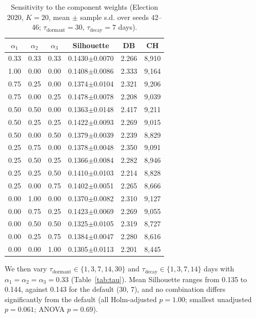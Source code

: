 \documentclass[pdflatex,sn-mathphys-num]{sn-jnl}%
\begin{document}
\begin{table}[t]
\centering
\caption{Sensitivity to the component weights (Election 2020, $K=20$, mean $\pm$ sample s.d. over seeds 42--46; $\tau_{\text{dormant}}=30$, $\tau_{\text{decay}}=7$ days).}
\label{tab:alpha}
\begin{tabular}{cccccc}
\toprule
$\alpha_1$ & $\alpha_2$ & $\alpha_3$ & Silhouette & DB & CH \\
\midrule
0.33 & 0.33 & 0.33 & 0.1430$\pm$0.0070 & 2.266 & 8,910 \\
1.00 & 0.00 & 0.00 & 0.1408$\pm$0.0086 & 2.333 & 9,164 \\
0.75 & 0.25 & 0.00 & 0.1374$\pm$0.0104 & 2.321 & 9,206 \\
0.75 & 0.00 & 0.25 & 0.1478$\pm$0.0078 & 2.208 & 9,039 \\
0.50 & 0.50 & 0.00 & 0.1363$\pm$0.0148 & 2.417 & 9,211 \\
0.50 & 0.25 & 0.25 & 0.1422$\pm$0.0093 & 2.269 & 9,015 \\
0.50 & 0.00 & 0.50 & 0.1379$\pm$0.0039 & 2.239 & 8,829 \\
0.25 & 0.75 & 0.00 & 0.1378$\pm$0.0048 & 2.350 & 9,091 \\
0.25 & 0.50 & 0.25 & 0.1366$\pm$0.0084 & 2.282 & 8,946 \\
0.25 & 0.25 & 0.50 & 0.1410$\pm$0.0103 & 2.214 & 8,828 \\
0.25 & 0.00 & 0.75 & 0.1402$\pm$0.0051 & 2.265 & 8,666 \\
0.00 & 1.00 & 0.00 & 0.1370$\pm$0.0082 & 2.310 & 9,127 \\
0.00 & 0.75 & 0.25 & 0.1423$\pm$0.0069 & 2.269 & 9,055 \\
0.00 & 0.50 & 0.50 & 0.1325$\pm$0.0105 & 2.319 & 8,727 \\
0.00 & 0.25 & 0.75 & 0.1384$\pm$0.0047 & 2.280 & 8,616 \\
0.00 & 0.00 & 1.00 & 0.1305$\pm$0.0113 & 2.201 & 8,445 \\
\bottomrule
\end{tabular}
\end{table}

We then vary $\tau_{\text{dormant}} \in \{1, 3, 7, 14, 30\}$ and $\tau_{\text{decay}} \in \{1, 3, 7, 14\}$ days with $\alpha_1 = \alpha_2 = \alpha_3 = 0.33$ (Table~\ref{tab:tau}). Mean Silhouette ranges from 0.135 to 0.144, against 0.143 for the default (30, 7), and no combination differs significantly from the default (all Holm-adjusted $p = 1.00$; smallest unadjusted $p = 0.061$; ANOVA $p = 0.69$).
\end{document}
